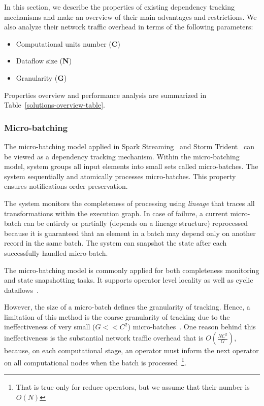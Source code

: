 In this section, we describe the properties of existing dependency tracking mechanisms and make an overview of their main advantages and restrictions. We also analyze their network traffic overhead in terms of the following parameters:
\begin{itemize}
    \item Computational units number (\textbf{C})
    \item Dataflow size (\textbf{N})
    \item Granularity (\textbf{G})
\end{itemize}

Properties overview and performance analysis are summarized in Table~\ref{solutions-overview-table}.

\subsubsection{Micro-batching}

The micro-batching model applied in Spark Streaming~\cite{Zaharia:2012:DSE:2342763.2342773} and Storm Trident~\cite{apache:storm:trident} can be viewed as a dependency tracking mechanism. Within the micro-batching model, system groups all input elements into small sets called micro-batches. The system sequentially and atomically processes micro-batches. This property ensures notifications order preservation. 

The system monitors the completeness of processing using {\em lineage} that traces all transformations within the execution graph. In case of failure, a current micro-batch can be entirely or partially (depends on a lineage structure) reprocessed because it is guaranteed that an element in a batch may depend only on another record in the same batch. The system can snapshot the state after each successfully handled micro-batch. 

The micro-batching model is commonly applied for both completeness monitoring and state snapshotting tasks.  It supports operator level locality as well as cyclic dataflows~\cite{meng2016mllib}. 

However, the size of a micro-batch defines the granularity of tracking. Hence, a limitation of this method is the coarse granularity of tracking due to the ineffectiveness of very small ($G << C^2$) micro-batches~\cite{Zaharia:2012:DSE:2342763.2342773}. One reason behind this ineffectiveness is the substantial network traffic overhead that is $O(\frac{NC^2}{G})$, because, on each computational stage, an operator must inform the next operator on all computational nodes when the batch is processed~\footnote{That is true only for reduce operators, but we assume that their number is $O(N)$}.

